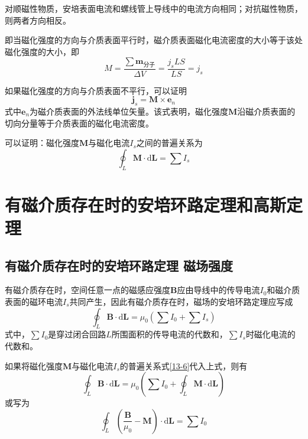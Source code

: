 \documentclass[
	12pt, %
	a4paper, %
]{myLegrandOrangeBook}
\newcommand{\rmd}{\mathrm{d}}
\begin{document}
对顺磁性物质，安培表面电流和螺线管上导线中的电流方向相同；对抗磁性物质，则两者方向相反。

即当磁化强度的方向与介质表面平行时，磁介质表面磁化电流密度的大小等于该处磁化强度的大小，即
\begin{equation}
    M = \frac{\sum  \boldsymbol{m}_{\text{分子}}}{\Delta V} = \frac{j_s L S}{L S} = j_s
\end{equation}

如果磁化强度的方向与介质表面不平行，可以证明
\begin{equation}
    \boldsymbol{j}_s = \boldsymbol{M} \times \boldsymbol{e}_n
\end{equation}
式中\(\boldsymbol{e}_n\)为磁介质表面的外法线单位矢量。该式表明，磁化强度\(\boldsymbol{M}\)沿磁介质表面的切向分量等于介质表面的磁化电流密度。

可以证明：磁化强度\(\boldsymbol{M}\)与磁化电流\(I_s\)之间的普遍关系为
\begin{equation}
    \oint_L \boldsymbol{M} \cdot \rmd \boldsymbol{L} = \sum I_s
    \label{13-6}
\end{equation}

\section{有磁介质存在时的安培环路定理和高斯定理}

\subsection{有磁介质存在时的安培环路定理 \quad 磁场强度}

有磁介质存在时，空间任意一点的磁感应强度\(\boldsymbol{B}\)应由导线中的传导电流\(I_0\)和磁介质表面的磁环电流\(I_s\)共同产生，因此有磁介质存在时，磁场的安培环路定理应写成
\begin{equation}
    \oint_L \boldsymbol{B} \cdot \rmd \boldsymbol{L} = \mu_0 \left(\sum I_0 + \sum I_s\right)
\end{equation}
式中，\(\sum I_0\)是穿过闭合回路\(L\)所围面积的传导电流的代数和，\(\sum I_s\)时磁化电流的代数和。

如果将磁化强度\(\boldsymbol{M}\)与磁化电流\(I_s\)的普遍关系式\ref{13-6}代入上式，则有
\begin{equation}
    \oint_L \boldsymbol{B} \cdot \rmd \boldsymbol{L} = \mu_0 \left(\sum I_0 + \oint_L \boldsymbol{M} \cdot \rmd \boldsymbol{L}\right)
\end{equation}
或写为
\begin{equation}
    \oint_L \left(\frac{\boldsymbol{B}}{\mu_0} - \boldsymbol{M}\right) \cdot \rmd \boldsymbol{L} = \sum I_0
    \label{13-9}
\end{equation}
\end{document}
